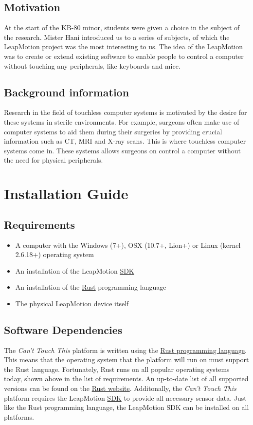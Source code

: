 \documentclass[a4paper]{article}
\providecommand{\tightlist}{%
\setlength{\itemsep}{0pt}\setlength{\parskip}{0pt}}
\begin{document}
  \subsection{Motivation}
  At the start of the KB-80 minor, students were given a choice in the subject
  of the research. Mister Hani introduced us to a series of subjects, of which
  the LeapMotion project was the most interesting to us. The idea of the
  LeapMotion was to create or extend existing software to enable people to
  control a computer without touching any peripherals, like keyboards and mice.

  \subsection{Background information}
  Research in the field of touchless computer systems is motivated by the desire
  for these systems in sterile environments. For example, surgeons often make
  use of computer systems to aid them during their surgeries by providing
  crucial information such as CT, MRI and X-ray scans. This is where touchless
  computer systems come in. These systems allows surgeons on control a computer
  without the need for physical peripherals.
  \clearpage

  \section{Installation Guide}
  \subsection{Requirements}
  \begin{itemize}
    \tightlist
    \item A computer with the Windows (7+), OSX (10.7+, Lion+) or
      Linux (kernel 2.6.18+) operating system
    \item An installation of the LeapMotion
      \href{https://developer.leapmotion.com/sdk/v2}{SDK}
    \item An installation of the
      \href{https://rustup.rs}{Rust} programming language
    \item The physical LeapMotion device itself
  \end{itemize}

  \subsection{Software Dependencies}
  The \textit{Can't Touch This} platform is written using the
  \href{https://rust-lang.org}{Rust programming language}. This means that the
  operating system that the platform will run on must support the Rust language.
  Fortunately, Rust runs on all popular operating systems today, shown above in
  the list of requirements. An up-to-date list of all supported versions can be
  found on the
  \href{https://forge.rust-lang.org/platform-support.html}{Rust website}.
  Additonally, the \textit{Can't Touch This} platform requires the LeapMotion
  \href{https://developer.leapmotion.com/sdk/v2}{SDK} to provide all necessary
  sensor data. Just like the Rust programming language, the LeapMotion SDK can
  be installed on all platforms.
\end{document}
